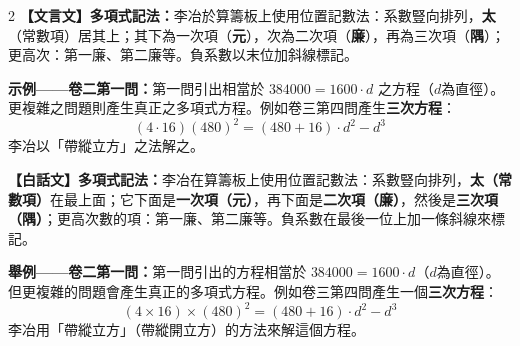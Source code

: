 \documentclass[11pt,a4paper]{article}
\begin{document}
\begin{paracol}{2}
\textbf{【文言文】}\textbf{多項式記法：}李冶於算籌板上使用位置記數法：系數豎向排列，\textbf{太}（常數項）居其上；其下為一次項（\textbf{元}），次為二次項（\textbf{廉}），再為三次項（\textbf{隅}）；更高次：第一廉、第二廉等。負系數以末位加斜線標記。

\vspace{0.3cm}
\textbf{示例——卷二第一問：}第一問引出相當於 $384000 = 1600 \cdot d$ 之方程（$d$為直徑）。更複雜之問題則產生真正之多項式方程。例如卷三第四問產生\textbf{三次方程}：
\[
(4 \cdot 16)(480)^2 = (480 + 16) \cdot d^2 - d^3
\]
李冶以「帶縱立方」之法解之。

\switchcolumn
\textbf{【白話文】}\textbf{多項式記法：}李冶在算籌板上使用位置記數法：系數豎向排列，\textbf{太（常數項）}在最上面；它下面是\textbf{一次項（元）}，再下面是\textbf{二次項（廉）}，然後是\textbf{三次項（隅）}；更高次數的項：第一廉、第二廉等。負系數在最後一位上加一條斜線來標記。

\vspace{0.3cm}
\textbf{舉例——卷二第一問：}第一問引出的方程相當於 $384000 = 1600 \cdot d$（$d$為直徑）。但更複雜的問題會產生真正的多項式方程。例如卷三第四問產生一個\textbf{三次方程}：
\[
(4 \times 16) \times (480)^2 = (480 + 16) \cdot d^2 - d^3
\]
李冶用「帶縱立方」（帶縱開立方）的方法來解這個方程。
\end{paracol}

\vspace{0.5cm}
\end{document}
